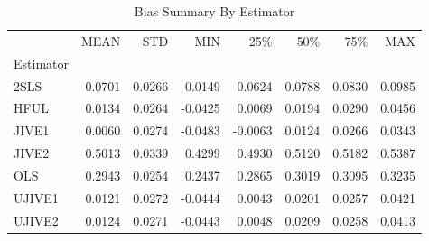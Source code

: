 \begin{table}[ht]
\centering
\caption{Bias Summary By Estimator}
\begin{tabular}{lrrrrrrr}
\toprule
 & MEAN & STD & MIN & 25\% & 50\% & 75\% & MAX \\
Estimator &  &  &  &  &  &  &  \\
\midrule
2SLS & 0.0701 & 0.0266 & 0.0149 & 0.0624 & 0.0788 & 0.0830 & 0.0985 \\
HFUL & 0.0134 & 0.0264 & -0.0425 & 0.0069 & 0.0194 & 0.0290 & 0.0456 \\
JIVE1 & 0.0060 & 0.0274 & -0.0483 & -0.0063 & 0.0124 & 0.0266 & 0.0343 \\
JIVE2 & 0.5013 & 0.0339 & 0.4299 & 0.4930 & 0.5120 & 0.5182 & 0.5387 \\
OLS & 0.2943 & 0.0254 & 0.2437 & 0.2865 & 0.3019 & 0.3095 & 0.3235 \\
UJIVE1 & 0.0121 & 0.0272 & -0.0444 & 0.0043 & 0.0201 & 0.0257 & 0.0421 \\
UJIVE2 & 0.0124 & 0.0271 & -0.0443 & 0.0048 & 0.0209 & 0.0258 & 0.0413 \\
\bottomrule
\end{tabular}
\end{table}

